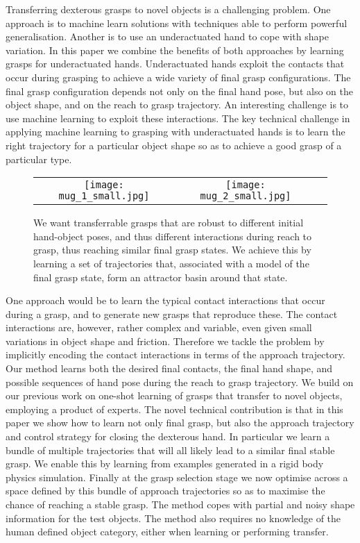 Transferring dexterous grasps to novel objects is a challenging problem. One approach is to machine learn solutions with techniques able to perform powerful generalisation. Another is to use an underactuated hand to cope with shape variation. In this paper we combine the benefits of both approaches by learning grasps for underactuated hands. Underactuated hands exploit the contacts that occur during grasping to achieve a wide variety of final grasp configurations. The final grasp configuration depends not only on the final hand pose, but also on the object shape, and on the reach to grasp trajectory. An interesting challenge is to use machine learning to exploit these interactions. The key technical challenge in applying machine learning to grasping with underactuated hands is to learn the right trajectory for a particular object shape so as to achieve a good grasp of a particular type. 

\begin{figure}
  \centering
  \begin{tabular}{ccc}
  \texttt{[image: mug\_1\_small.jpg]} &
  \texttt{[image: mug\_2\_small.jpg]} \\
  \end{tabular}
 \caption{{We want transferrable grasps that are robust to different initial hand-object poses, and thus different interactions during reach to grasp, thus reaching similar final grasp states. We achieve this by learning a set of trajectories that, associated with a model of the final grasp state, form an attractor basin around that state.}}
  \label{fig:two_grasps}
\end{figure}

One approach would be to learn the typical contact interactions that occur during a grasp, and to generate new grasps that reproduce these. The contact interactions are, however, rather complex and variable, even given small variations in object shape and friction. Therefore we tackle the problem by implicitly encoding the contact interactions in terms of the approach trajectory. Our method learns both the desired final contacts, the final hand shape, and possible sequences of hand pose during the reach to grasp trajectory. We build on our previous work on one-shot learning of grasps that transfer to novel objects, employing a product of experts. The novel technical contribution is that in this paper we show how to learn not only final grasp, but also the approach trajectory and control strategy for closing the dexterous hand. In particular we learn a bundle of multiple trajectories that will all likely lead to a similar final stable grasp. We enable this by learning from examples generated in a rigid body physics simulation. Finally at the grasp selection stage we now optimise across a space defined by this bundle of approach trajectories so as to maximise the chance of reaching a stable grasp. The method copes with partial and noisy shape information for the test objects. The method also requires no knowledge of the human defined object category, either when learning or performing transfer.

